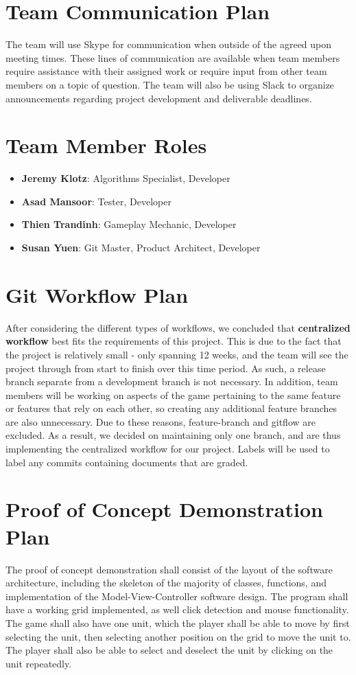 \documentclass{article}
\begin{document}
\newpage

	
\section{Team Communication Plan}
The team will use Skype for communication when outside of the agreed upon meeting times. These lines of communication are available when team members require assistance with their assigned work or require input from other team members on a topic of question. The team will also be using Slack to organize announcements regarding project development and deliverable deadlines.
	
\section{Team Member Roles}
\begin{itemize}
    \item \textbf{Jeremy Klotz}: Algorithms Specialist, Developer
    \item \textbf{Asad Mansoor}: Tester, Developer
    \item \textbf{Thien Trandinh}: Gameplay Mechanic, Developer
    \item \textbf{Susan Yuen}: Git Master, Product Architect, Developer
\end{itemize}
	
\section{Git Workflow Plan}
After considering the different types of workflows, we concluded that \textbf{centralized workflow} best fits the requirements of this project. This is due to the fact that the project is relatively small - only spanning 12 weeks, and the team will see the project through from start to finish over this time period. As such, a release branch  separate from a development branch is not necessary. In addition, team members will be working on aspects of the game pertaining to the same feature or features that rely on each other, so creating any additional feature branches are also unnecessary. Due to these reasons, feature-branch and gitflow are excluded. As a result, we decided on maintaining only one branch, and are thus implementing the centralized workflow for our project. Labels will be used to label any commits containing documents that are graded.
	
\section{Proof of Concept Demonstration Plan}
The proof of concept demonstration shall consist of the layout of the software architecture, including the skeleton of the majority of classes, functions, and implementation of the Model-View-Controller software design. The program shall have a working grid implemented, as well click detection and mouse functionality. The game shall also have one unit, which the player shall be able to move by first selecting the unit, then selecting another position on the grid to move the unit to. The player shall also be able to select and deselect the unit by clicking on the unit repeatedly.
\end{document}
